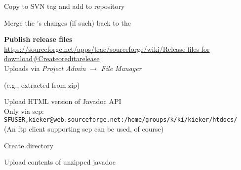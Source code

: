 \begin{compactenum}
\item Copy  to SVN tag and add to repository
\item Merge the 's changes (if such) back to the 
\item \textbf{Publish release files}\\
{\scriptsize\url{https://sourceforge.net/apps/trac/sourceforge/wiki/Release files for download#Createoreditarelease}}\\
Uploads via \textit{Project Admin} $\rightarrow$ \textit{File Manager}
\begin{compactenum}
\item \dir{/}
\begin{compactenum}
\item {}
\item {}
\item {} (e.g., extracted from zip)
\end{compactenum}
\item {}
\begin{compactenum}
\item {}
\end{compactenum}
\item {}
\begin{compactenum}
\item {}
\end{compactenum}
\end{compactenum}
\item Upload HTML version of Javadoc API\\
Only via scp: {\scriptsize\texttt{SFUSER,kieker@web.sourceforge.net:/home/groups/k/ki/kieker/htdocs/}}\\
(An ftp client supporting scp can be used, of course)
\begin{compactenum}
\item Create directory 
\item Upload contents of unzipped javadoc
\end{compactenum}
\end{compactenum}